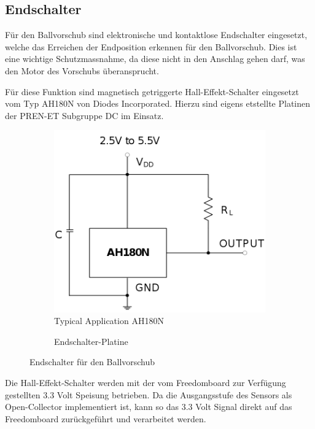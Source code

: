 \subsection{Endschalter}
Für den Ballvorschub sind elektronische und kontaktlose Endschalter
eingesetzt, welche das Erreichen der Endposition erkennen für den
Ballvorschub. Dies ist eine wichtige Schutzmassnahme, da diese
nicht in den Anschlag gehen darf, was den Motor des Vorschubs
überansprucht.

Für diese Funktion sind magnetisch getriggerte Hall-Effekt-Schalter
eingesetzt vom Typ AH180N von Diodes Incorporated. Hierzu sind eigens
etstellte Platinen der PREN-ET Subgruppe DC im Einsatz.

\begin{figure}[h!]
	\centering
	\begin{subfigure}[b]{0.45\textwidth}
		\centering
		\includegraphics[width=1\textwidth]{../../fig/et/ah180n.png}
		\caption{Typical Application AH180N}
	\end{subfigure}
	\begin{subfigure}[b]{0.45\textwidth}
		\centering
		\caption{Endschalter-Platine}
	\end{subfigure}
	\caption{Endschalter für den Ballvorschub}
\end{figure}

Die Hall-Effekt-Schalter werden mit der vom Freedomboard zur Verfügung
gestellten 3.3 Volt Speisung betrieben. Da die Ausgangsstufe des Sensors
als Open-Collector implementiert ist, kann so das 3.3 Volt Signal direkt
auf das Freedomboard zurückgeführt und verarbeitet werden. 

